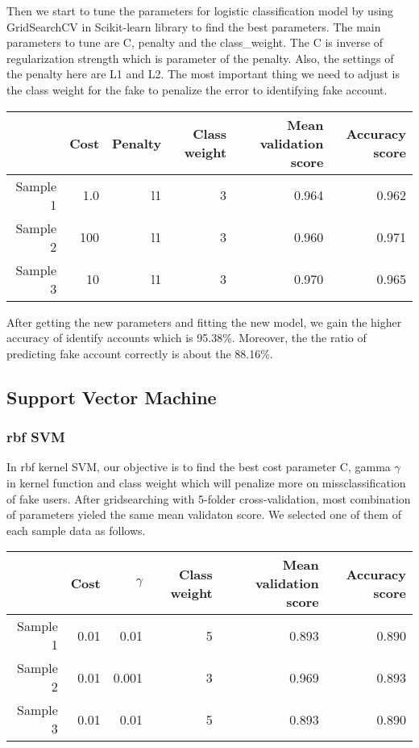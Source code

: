 \documentclass[a4paper, 12pt]{report}
\begin{document}
\noindent Then we start to tune the parameters for logistic classification model by using GridSearchCV in Scikit-learn library to ﬁnd the best parameters. The main parameters to tune are C, penalty and the class\_weight. The C is inverse of regularization strength which is parameter of the penalty. Also, the settings of the penalty here are L1 and L2. The most important thing we need to adjust is the class weight for the fake to penalize the error to identifying fake account.

\begin{table}[h!]
	 \label{tab:title} 
	\begin{center}
		\begin{tabular}{rrrrrr}
			\hline
			& Cost & Penalty & Class weight & Mean validation score & Accuracy score\\
			\hline
			Sample 1 & 1.0 & l1 & 3 & 0.964 & 0.962\\
			Sample 2 & 100 & l1 & 3 & 0.960 & 0.971\\
			Sample 3 & 10  & l1 & 3 & 0.970 & 0.965\\
			\hline
		\end{tabular}
	\end{center}
\end{table}

\noindent After getting the new parameters and fitting the new model, we gain the higher accuracy of identify accounts which is 95.38\%. Moreover, the the ratio of predicting fake account correctly is about the 88.16\%.

\subsection*{Support Vector Machine}
\subsubsection*{rbf SVM}
In rbf kernel SVM, our objective is to find the best cost parameter C, gamma $\gamma$ in kernel function and class weight which will penalize more on missclassification of fake users. After gridsearching with 5-folder cross-validation, most combination of parameters yieled the same mean validaton score. We selected one of them of each sample data as follows.

\begin{table}[h!]
	 \label{tab:title} 
	\begin{center}
		\begin{tabular}{rrrrrr}
			\hline
			& Cost & $\gamma$ & Class weight & Mean validation score & Accuracy score\\
			\hline
			Sample 1 & 0.01 & 0.01 & 5 & 0.893 & 0.890\\
			Sample 2 & 0.01 & 0.001 & 3 & 0.969 & 0.893\\
			Sample 3 & 0.01 & 0.01 & 5 & 0.893 & 0.890\\
			\hline
		\end{tabular}
	\end{center}
\end{table}
\end{document}
